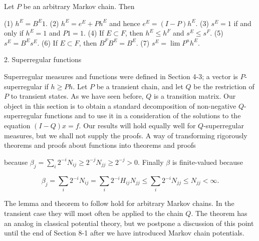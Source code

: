 Let $P$ be an arbitrary Markov chain. Then

(1) $h^E = B^E 1$.
(2) $h^E = e^E + Ph^E$ and hence $e^E = (I - P)h^E$.
(3) $s^E = 1$ if and only if $h^E = 1$ and $P 1 = 1$.
(4) If $E \subset F$, then $h^E \leq h^F$ and $s^E \leq s^F$.
(5) $s^E = B^Es^E$.
(6) If $E \subset F$, then $B^F B^E = B^E$.
(7) $s^E = \lim P^n h^E$.

2. Superregular functions

Superregular measures and functions were defined in Section 4-3; a vector is $P$-superregular if $h \geq Ph$. Let $P$ be a transient chain, and let $Q$ be the restriction of $P$ to transient states. As we have seen before, $Q$ is a transition matrix. Our object in this section is to obtain a standard decomposition of non-negative $Q$-superregular functions and to use it in a consideration of the solutions to the equation $(I - Q)x = f$. Our results will hold equally well for $Q$-superregular measures, but we shall not supply the proofs. A way of transforming rigorously theorems and proofs about functions into theorems and proofs

because $\beta_j = \sum_i 2^{-i} N_{ij} \geq 2^{-j} N_{jj} \geq 2^{-j} > 0$. Finally $\beta$ is finite-valued because

$$\beta_j = \sum_i 2^{-i} N_{ij} = \sum_i 2^{-i} H_{ij} N_{jj} \leq \sum_i 2^{-i} N_{jj} \leq N_{jj} < \infty.$$

The lemma and theorem to follow hold for arbitrary Markov chains. In the transient case they will most often be applied to the chain $Q$. The theorem has an analog in classical potential theory, but we postpone a discussion of this point until the end of Section 8-1 after we have introduced Markov chain potentials.
